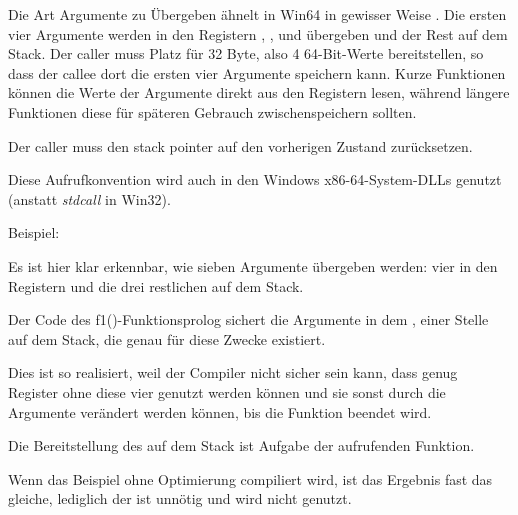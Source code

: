 Die Art Argumente zu Übergeben ähnelt in Win64 in gewisser Weise .
Die ersten vier Argumente werden in den Registern \RCX, \RDX,  und 
übergeben und der Rest auf dem Stack.
Der \gls{caller} muss Platz für 32 Byte, also 4 64-Bit-Werte bereitstellen, so
dass der \gls{callee} dort die ersten vier Argumente speichern kann.
Kurze Funktionen können die Werte der Argumente direkt aus den Registern lesen,
während längere Funktionen diese für späteren Gebrauch zwischenspeichern sollten.

Der \gls{caller} muss den \gls{stack pointer} auf den vorherigen Zustand zurücksetzen.

Diese Aufrufkonvention wird auch in den Windows x86-64-System-DLLs genutzt
(anstatt \emph{stdcall} in Win32).

Beispiel:



%



Es ist hier klar erkennbar, wie sieben Argumente übergeben werden: vier in den
Registern und die drei restlichen auf dem Stack.

Der Code des f1()-Funktionsprolog sichert die Argumente in dem ,
einer Stelle auf dem Stack, die genau für diese Zwecke existiert.

Dies ist so realisiert, weil der Compiler nicht sicher sein kann, dass genug Register
ohne diese vier genutzt werden können und sie sonst durch die Argumente verändert
werden können, bis die Funktion beendet wird.

Die Bereitstellung des  auf dem Stack ist Aufgabe der aufrufenden Funktion.

%


Wenn das Beispiel ohne Optimierung compiliert wird, ist das Ergebnis fast das gleiche,
lediglich der  ist unnötig und wird nicht genutzt.

\label{using_MOV_and_pack_of_LEA_to_load_values}

